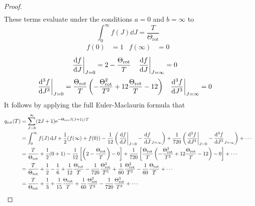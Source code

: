 \documentclass[../psets.tex]{subfiles}
\begin{document}
\begin{enumerate}
\begin{proof}
\begin{align*}
        \end{align*}
        These terms evaluate under the conditions $a=0$ and $b=\infty$ to
        \begin{equation*}
            \int_0^\infty f(J)\dd{J} = \frac{T}{\Theta_\text{rot}}
        \end{equation*}
        \begin{align*}
            f(0) &= 1&
            f(\infty) &= 0
        \end{align*}
        \begin{align*}
            \eval{\dv{f}{J}}_{J=0} &= 2-\frac{\Theta_\text{rot}}{T}&
            \eval{\dv{f}{J}}_{J=\infty} &= 0
        \end{align*}
        \begin{align*}
            \eval{\dv[3]{f}{J}}_{J=0} &= \frac{\Theta_\text{rot}}{T}\left( -\frac{\Theta_\text{rot}^2}{T^2}+12\frac{\Theta_\text{rot}}{T}-12 \right)&
            \eval{\dv[3]{f}{J}}_{J=\infty} &= 0
        \end{align*}
        It follows by applying the full Euler-Maclaurin formula that
        \begin{align*}
            q_\text{rot}(T) &= \sum_{J=0}^\infty(2J+1)\e[-\Theta_\text{rot}J(J+1)/T]\\
            &= \int_0^\infty f(J)\dd{J}+\frac{1}{2}(f(\infty)+f(0))-\frac{1}{12}\left( \eval{\dv{f}{J}}_{J=0}-\dv{f}{J}_{J=\infty} \right)+\frac{1}{720}\left( \eval{\dv[3]{f}{J}}_{J=0}-\dv[3]{f}{J}_{J=\infty} \right)+\cdots\\
            &= \frac{T}{\Theta_\text{rot}}+\frac{1}{2}(0+1)-\frac{1}{12}\left[ \left( 2-\frac{\Theta_\text{rot}}{T} \right)-0 \right]+\frac{1}{720}\left[ \frac{\Theta_\text{rot}}{T}\left( -\frac{\Theta_\text{rot}^2}{T^2}+12\frac{\Theta_\text{rot}}{T}-12 \right)-0 \right]+\cdots\\
            &= \frac{T}{\Theta_\text{rot}}+\frac{1}{2}-\frac{1}{6}+\frac{1}{12}\frac{\Theta_\text{rot}}{T}-\frac{1}{720}\frac{\Theta_\text{rot}^3}{T^3}+\frac{1}{60}\frac{\Theta_\text{rot}^2}{T^2}-\frac{1}{60}\frac{\Theta_\text{rot}}{T}+\cdots\\
            &= \frac{T}{\Theta_\text{rot}}+\frac{1}{3}+\frac{1}{15}\frac{\Theta_\text{rot}}{T}+\frac{1}{60}\frac{\Theta_\text{rot}^2}{T^2}-\frac{1}{720}\frac{\Theta_\text{rot}^3}{T^3}+\cdots\\

\end{align*}
\end{proof}
\end{enumerate}
\end{document}
